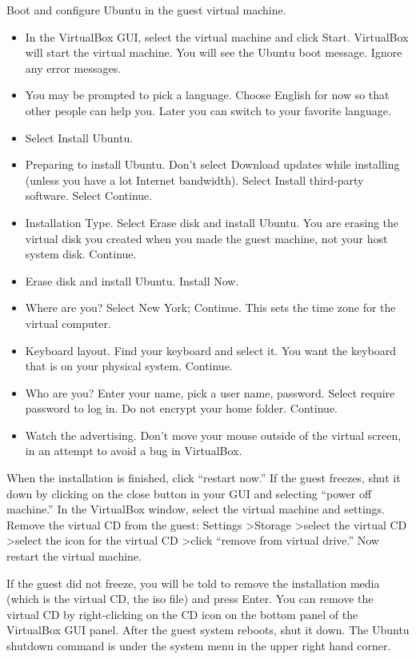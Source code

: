 \documentclass{article}
\begin{document}
Boot and configure Ubuntu in the guest virtual machine.
\begin{itemize}
\item In the VirtualBox GUI, select the virtual machine and click
  Start. VirtualBox will start the virtual machine. You will see the
  Ubuntu boot message. Ignore any error messages.
\item You may be prompted to pick a language. Choose English for now so
  that other people can help you. Later you can switch to your favorite
  language.
\item Select Install Ubuntu.
\item Preparing to install Ubuntu. Don't select Download updates while
  installing (unless you have a lot Internet bandwidth). Select
  Install third-party software. Select Continue.
\item Installation Type. Select Erase disk and install Ubuntu. You are
  erasing the virtual disk you created when you made the guest machine,
  not your host system disk. Continue.
\item Erase disk and install Ubuntu. Install Now.
\item Where are you? Select New York; Continue. This sets the time zone
  for the virtual computer.
\item Keyboard layout. Find your keyboard and select it. You want the
  keyboard that is on your physical system. Continue.
\item Who are you? Enter your name, pick a user name, password. Select
  require password to log in. Do not encrypt your home folder. Continue.
\item Watch the advertising. Don't move your mouse outside of the
  virtual screen, in an attempt to avoid a bug in VirtualBox.
\end{itemize}

When the installation is finished, click ``restart now.'' If the guest
freezes, shut it down by clicking on the close button in your GUI and
selecting ``power off machine.'' In the VirtualBox window, select the
virtual machine and settings. Remove the virtual CD from the guest:
Settings 	\textgreater Storage \textgreater select the virtual CD
\textgreater select the icon for the
virtual CD \textgreater click ``remove from virtual drive.'' Now restart the
virtual machine.

If the guest did not freeze,
you will be told to remove the installation media
(which is the virtual CD, the iso file) and press Enter. You can remove
the virtual CD by right-clicking on the CD icon on the bottom panel of the 
VirtualBox GUI panel. After the guest system reboots, shut it down. The Ubuntu shutdown
command is under the system menu in the upper right hand corner.
\end{document}
